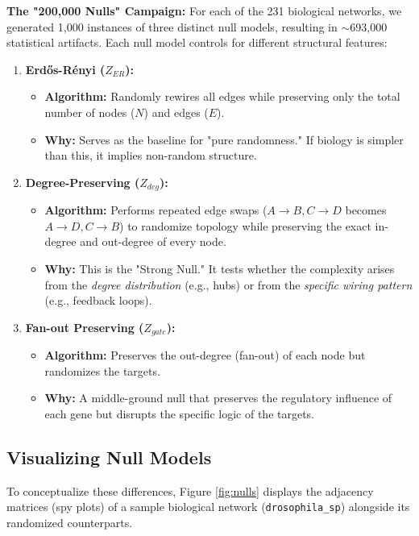 \documentclass{article}
\begin{document}
\textbf{The "200,000 Nulls" Campaign:}
For each of the 231 biological networks, we generated 1,000 instances of three distinct null models, resulting in $\sim$693,000 statistical artifacts. Each null model controls for different structural features:

\begin{enumerate}
    \item \textbf{Erdős-Rényi ($Z_{ER}$):} 
    \begin{itemize}
        \item \textbf{Algorithm:} Randomly rewires all edges while preserving only the total number of nodes ($N$) and edges ($E$).
        \item \textbf{Why:} Serves as the baseline for "pure randomness." If biology is simpler than this, it implies non-random structure.
    \end{itemize}
    
    \item \textbf{Degree-Preserving ($Z_{deg}$):}
    \begin{itemize}
        \item \textbf{Algorithm:} Performs repeated edge swaps ($A \to B, C \to D$ becomes $A \to D, C \to B$) to randomize topology while preserving the exact in-degree and out-degree of every node.
        \item \textbf{Why:} This is the "Strong Null." It tests whether the complexity arises from the \textit{degree distribution} (e.g., hubs) or from the \textit{specific wiring pattern} (e.g., feedback loops).
    \end{itemize}

    \item \textbf{Fan-out Preserving ($Z_{gate}$):}
    \begin{itemize}
        \item \textbf{Algorithm:} Preserves the out-degree (fan-out) of each node but randomizes the targets.
        \item \textbf{Why:} A middle-ground null that preserves the regulatory influence of each gene but disrupts the specific logic of the targets.
    \end{itemize}
\end{enumerate}

\subsection{Visualizing Null Models}
To conceptualize these differences, Figure \ref{fig:nulls} displays the adjacency matrices (spy plots) of a sample biological network (\texttt{drosophila\_sp}) alongside its randomized counterparts.
\end{document}
